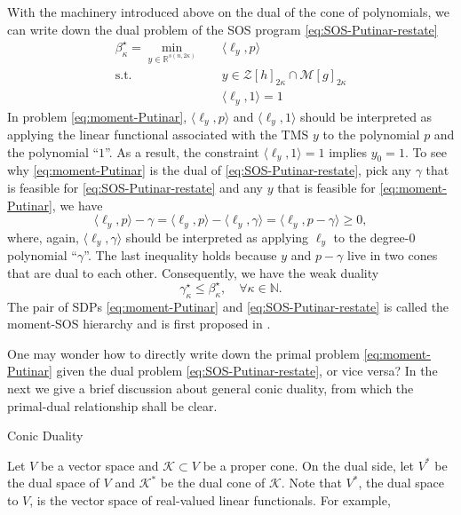 \documentclass[
]{book}
\theoremstyle{definition}
\theoremstyle{definition}
\theoremstyle{definition}
\theoremstyle{definition}
\theoremstyle{remark}
\begin{document}
With the machinery introduced above on the dual of the cone of polynomials, we can write down the dual problem of the SOS program \eqref{eq:SOS-Putinar-restate}
\begin{equation}
\boxed{
\begin{split}
\beta_{\kappa}^\star = \min_{y \in \mathbb{R}^{s(n,2\kappa)}} & \quad \langle \ell_y, p \rangle \\
\mathrm{s.t.}& \quad y \in \mathcal{Z}[h]_{2\kappa} \cap \mathcal{M}[g]_{2\kappa} \\
& \quad \langle \ell_y, 1 \rangle = 1
\end{split}
}
\label{eq:moment-Putinar}
\end{equation}
In problem \eqref{eq:moment-Putinar}, \(\langle \ell_y, p \rangle\) and \(\langle \ell_y, 1 \rangle\) should be interpreted as applying the linear functional associated with the TMS \(y\) to the polynomial \(p\) and the polynomial ``\(1\)''. As a result, the constraint \(\langle \ell_y, 1 \rangle=1\) implies \(y_0 = 1\). To see why \eqref{eq:moment-Putinar} is the dual of \eqref{eq:SOS-Putinar-restate}, pick any \(\gamma\) that is feasible for \eqref{eq:SOS-Putinar-restate} and any \(y\) that is feasible for \eqref{eq:moment-Putinar}, we have
\[
\langle \ell_y, p \rangle - \gamma = \langle \ell_y, p \rangle - \langle \ell_y, \gamma \rangle = \langle \ell_y, p - \gamma \rangle \geq 0,
\]
where, again, \(\langle \ell_y, \gamma \rangle\) should be interpreted as applying \(\ell_y\) to the degree-\(0\) polynomial ``\(\gamma\)''. The last inequality holds because \(y\) and \(p - \gamma\) live in two cones that are dual to each other. Consequently, we have the weak duality
\[
\gamma_{\kappa}^\star \leq \beta_{\kappa}^\star, \quad \forall \kappa \in \mathbb{N}.
\]
The pair of SDPs \eqref{eq:moment-Putinar} and \eqref{eq:SOS-Putinar-restate} is called the moment-SOS hierarchy and is first proposed in \citep{lasserre01siopt-global}.

One may wonder how to directly write down the primal problem \eqref{eq:moment-Putinar} given the dual problem \eqref{eq:SOS-Putinar-restate}, or vice versa? In the next we give a brief discussion about general conic duality, from which the primal-dual relationship shall be clear.

Conic Duality

Let \(V\) be a vector space and \(\mathcal{K}\subset V\) be a proper cone. On the dual side, let \(V^*\) be the dual space of \(V\) and \(\mathcal{K}^*\) be the dual cone of \(\mathcal{K}\). Note that \(V^*\), the dual space to \(V\), is the vector space of real-valued linear functionals. For example,
\end{document}
